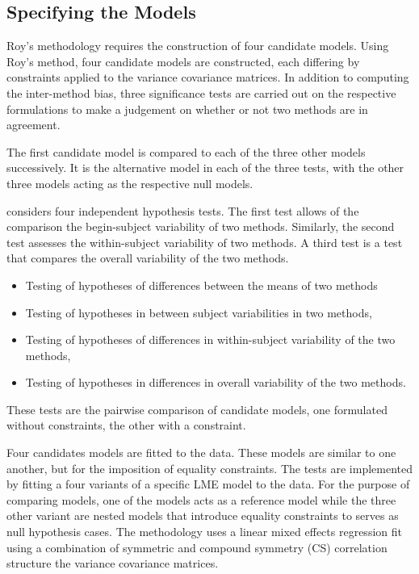 \documentclass[12pt, a4paper]{report}
\theoremstyle{plain}
\theoremstyle{definition}
\theoremstyle{remark}
\begin{document}
	\subsection{Specifying the Models}
	Roy's methodology requires the construction of four candidate models. 
	Using Roy's method, four candidate models are constructed, each differing by constraints applied to the variance covariance matrices. In addition to computing the inter-method bias, three significance tests are carried out on the respective formulations to make a judgement on whether or not two methods are in agreement.
	
	The first candidate model is compared to each of the three other models successively. It is the alternative model in each of the three tests, with the other three models acting as the respective null models.
	
	
	\citet{ARoy2009} considers four independent hypothesis tests. The first test allows of the comparison the begin-subject variability of two methods. Similarly, the second test assesses the within-subject variability of two methods. A third test is a test that compares the overall variability of the two methods.
	\begin{itemize}
		\item Testing of hypotheses of differences between the means of
		two methods\item Testing of hypotheses in between subject
		variabilities in two methods, \item Testing of hypotheses of
		differences in within-subject variability of the two methods,
		\item Testing of hypotheses in differences in overall variability
		of the two methods.
	\end{itemize}
	
	
	These tests are the pairwise comparison of candidate models, one formulated without constraints, the other with a constraint.
	
	
	Four candidates models are fitted to the data. These models are similar to one another, but for the imposition of equality constraints. The tests are implemented by fitting a four variants of a specific LME model to the data. For the purpose of comparing models, one of the models acts as a reference model while the three other variant are nested models that introduce equality constraints to serves as null hypothesis cases. The methodology uses a linear mixed effects regression fit using a combination of symmetric and 
	compound symmetry (CS) correlation structure the variance covariance matrices.
	
\end{document}

